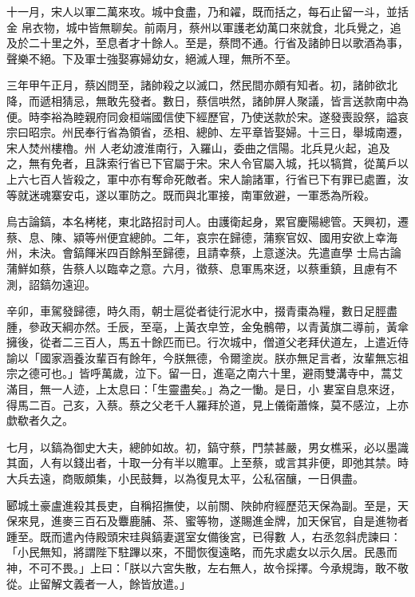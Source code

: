 \begin{pinyinscope}
 十一月，宋人以軍二萬來攻。城中食盡，乃和糴，既而括之，每石止留一斗，並括金
 帛衣物，城中皆無聊矣。前兩月，蔡州以軍護老幼萬口來就食，北兵覺之，追及於二十里之外，至息者才十餘人。至是，蔡問不通。行省及諸帥日以歌酒為事，聲樂不絕。下及軍士強娶寡婦幼女，絕滅人理，無所不至。



 三年甲午正月，蔡凶問至，諸帥殺之以滅口，然民間亦頗有知者。初，諸帥欲北降，而遞相猜忌，無敢先發者。數日，蔡信哄然，諸帥屏人聚議，皆言送款南中為便。時李裕為睦親府同僉桓端國信使下經歷官，乃使送款於宋。遂發喪設祭，謚哀宗曰昭宗。州民奉行省為領省，丞相、總帥、左平章皆娶婦。十三日，舉城南遷，宋人焚州樓櫓。州
 人老幼渡淮南行，入羅山，委曲之信陽。北兵見火起，追及之，無有免者，且誅索行省已下官屬于宋。宋人令官屬入城，托以犒賞，從萬戶以上六七百人皆殺之，軍中亦有奪命死敵者。宋人諭諸軍，行省已下有罪已處置，汝等就迷魂寨安屯，遂以軍防之。既而與北軍接，南軍斂避，一軍悉為所殺。



 烏古論鎬，本名栲栳，東北路招討司人。由護衛起身，累官慶陽總管。天興初，遷蔡、息、陳、潁等州便宜總帥。二年，哀宗在歸德，蒲察官奴、國用安欲上幸海州，未決。會鎬餫米四百餘斛至歸德，且請幸蔡，上意遂決。先遣直學
 士烏古論蒲鮮如蔡，告蔡人以臨幸之意。六月，徵蔡、息軍馬來迓，以蔡重鎮，且慮有不測，詔鎬勿遠迎。



 辛卯，車駕發歸德，時久雨，朝士扈從者徒行泥水中，掇青棗為糧，數日足脛盡腫，參政天綱亦然。壬辰，至亳，上黃衣皁笠，金兔鶻帶，以青黃旗二導前，黃傘擁後，從者二三百人，馬五十餘匹而已。行次城中，僧道父老拜伏道左，上遣近侍諭以「國家涵養汝輩百有餘年，今朕無德，令爾塗炭。朕亦無足言者，汝輩無忘祖宗之德可也。」皆呼萬歲，泣下。留一日，進亳之南六十里，避雨雙溝寺中，蒿艾滿目，無一人迹，上太息曰：「生靈盡矣。」為之一慟。是日，小
 婁室自息來迓，得馬二百。己亥，入蔡。蔡之父老千人羅拜於道，見上儀衛蕭條，莫不感泣，上亦歔欷者久之。



 七月，以鎬為御史大夫，總帥如故。初，鎬守蔡，門禁甚嚴，男女樵采，必以墨識其面，人有以錢出者，十取一分有半以贍軍。上至蔡，或言其非便，即弛其禁。時大兵去遠，商販頗集，小民鼓舞，以為復見太平，公私宿釀，一日俱盡。



 郾城土豪盧進殺其長吏，自稱招撫使，以前關、陜帥府經歷范天保為副。至是，天保來見，進麥三百石及麞鹿脯、茶、蜜等物，遂賜進金牌，加天保官，自是進物者踵至。既而遣內侍殿頭宋珪與鎬妻選室女備後宮，已得數
 人，右丞忽斜虎諫曰：「小民無知，將謂陛下駐蹕以來，不聞恢復遠略，而先求處女以示久居。民愚而神，不可不畏。」上曰：「朕以六宮失散，左右無人，故令採擇。今承規誨，敢不敬從。止留解文義者一人，餘皆放遣。」




\end{pinyinscope}
